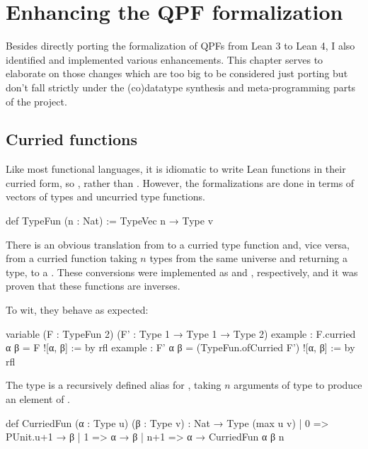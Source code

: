 
\chapter{Enhancing the QPF formalization}%
\label{ch:enhancing}


Besides directly porting the formalization of QPFs from Lean 3 to Lean 4, I also identified and implemented various enhancements. 
This chapter serves to elaborate on those changes which are too big to be considered just porting but don't fall strictly under the (co)datatype synthesis and meta-programming parts of the project.






\section{Curried functions}
Like most functional languages, it is idiomatic to write Lean functions in their curried form, 
so , rather than .
However, the formalizations are done in terms of vectors of types and uncurried type functions.

\begin{leancode}
    def TypeFun (n : Nat) := TypeVec n → Type v
\end{leancode}

There is an obvious translation from  to a curried type function and, vice versa, from a curried function taking $n$ types from the same universe and returning a type, to a .
These conversions were implemented as  and , respectively, and it was proven that these functions are inverses. 

To wit, they behave as expected:
\begin{leancode}
  variable (F : TypeFun 2) (F' : Type 1 → Type 1 → Type 2)
  example : F.curried α β = F ![α, β]                 := by rfl
  example : F' α β = (TypeFun.ofCurried F') ![α, β]   := by rfl
\end{leancode}

The type  is a recursively defined alias for , taking $n$ arguments of type  to produce an element of .
\begin{leancode}
  def CurriedFun (α : Type u) (β : Type v) : Nat → Type (max u v)
    | 0   => PUnit.{u+1} → β
    | 1   => α → β
    | n+1 => α → CurriedFun α β n
\end{leancode}

